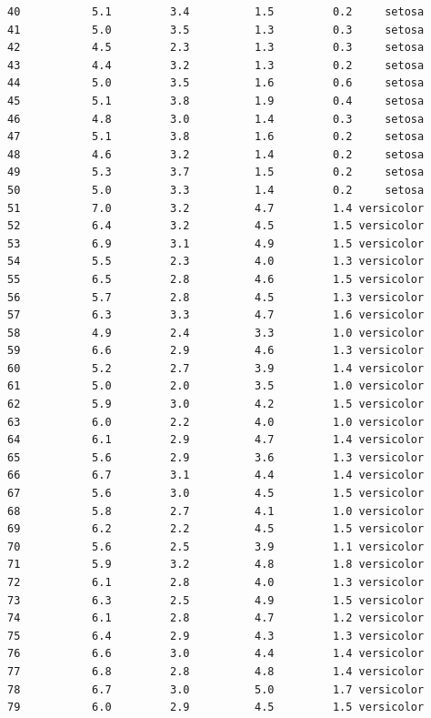 \documentclass[
  letterpaper,
]{book}
\begin{document}
\begin{verbatim}
40           5.1         3.4          1.5         0.2     setosa
41           5.0         3.5          1.3         0.3     setosa
42           4.5         2.3          1.3         0.3     setosa
43           4.4         3.2          1.3         0.2     setosa
44           5.0         3.5          1.6         0.6     setosa
45           5.1         3.8          1.9         0.4     setosa
46           4.8         3.0          1.4         0.3     setosa
47           5.1         3.8          1.6         0.2     setosa
48           4.6         3.2          1.4         0.2     setosa
49           5.3         3.7          1.5         0.2     setosa
50           5.0         3.3          1.4         0.2     setosa
51           7.0         3.2          4.7         1.4 versicolor
52           6.4         3.2          4.5         1.5 versicolor
53           6.9         3.1          4.9         1.5 versicolor
54           5.5         2.3          4.0         1.3 versicolor
55           6.5         2.8          4.6         1.5 versicolor
56           5.7         2.8          4.5         1.3 versicolor
57           6.3         3.3          4.7         1.6 versicolor
58           4.9         2.4          3.3         1.0 versicolor
59           6.6         2.9          4.6         1.3 versicolor
60           5.2         2.7          3.9         1.4 versicolor
61           5.0         2.0          3.5         1.0 versicolor
62           5.9         3.0          4.2         1.5 versicolor
63           6.0         2.2          4.0         1.0 versicolor
64           6.1         2.9          4.7         1.4 versicolor
65           5.6         2.9          3.6         1.3 versicolor
66           6.7         3.1          4.4         1.4 versicolor
67           5.6         3.0          4.5         1.5 versicolor
68           5.8         2.7          4.1         1.0 versicolor
69           6.2         2.2          4.5         1.5 versicolor
70           5.6         2.5          3.9         1.1 versicolor
71           5.9         3.2          4.8         1.8 versicolor
72           6.1         2.8          4.0         1.3 versicolor
73           6.3         2.5          4.9         1.5 versicolor
74           6.1         2.8          4.7         1.2 versicolor
75           6.4         2.9          4.3         1.3 versicolor
76           6.6         3.0          4.4         1.4 versicolor
77           6.8         2.8          4.8         1.4 versicolor
78           6.7         3.0          5.0         1.7 versicolor
79           6.0         2.9          4.5         1.5 versicolor

\end{verbatim}
\end{document}
